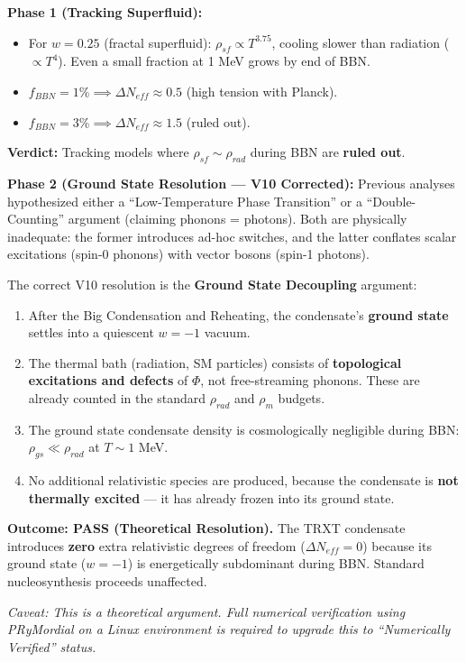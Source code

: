 \documentclass[a4paper,12pt]{article}
\begin{document}
\textbf{Phase 1 (Tracking Superfluid):}
\begin{itemize}
    \item For $w = 0.25$ (fractal superfluid): $\rho_{sf} \propto T^{3.75}$, cooling slower than radiation ($\propto T^4$). Even a small fraction at 1 MeV grows by end of BBN.
    \item $f_{BBN} = 1\% \implies \Delta N_{eff} \approx 0.5$ (high tension with Planck).
    \item $f_{BBN} = 3\% \implies \Delta N_{eff} \approx 1.5$ (ruled out).
\end{itemize}
\textbf{Verdict:} Tracking models where $\rho_{sf} \sim \rho_{rad}$ during BBN are \textbf{ruled out}.

\textbf{Phase 2 (Ground State Resolution --- V10 Corrected):}
Previous analyses hypothesized either a ``Low-Temperature Phase Transition'' or a ``Double-Counting'' argument (claiming phonons = photons). Both are physically inadequate: the former introduces ad-hoc switches, and the latter conflates scalar excitations (spin-0 phonons) with vector bosons (spin-1 photons).

The correct V10 resolution is the \textbf{Ground State Decoupling} argument:
\begin{enumerate}
    \item After the Big Condensation and Reheating, the condensate's \textbf{ground state} settles into a quiescent $w = -1$ vacuum.
    \item The thermal bath (radiation, SM particles) consists of \textbf{topological excitations and defects} of $\Phi$, not free-streaming phonons. These are already counted in the standard $\rho_{rad}$ and $\rho_m$ budgets.
    \item The ground state condensate density is cosmologically negligible during BBN: $\rho_{gs} \ll \rho_{rad}$ at $T \sim 1$ MeV.
    \item No additional relativistic species are produced, because the condensate is \textbf{not thermally excited} --- it has already frozen into its ground state.
\end{enumerate}

\textbf{Outcome: PASS (Theoretical Resolution).} The TRXT condensate introduces \textbf{zero} extra relativistic degrees of freedom ($\Delta N_{eff} = 0$) because its ground state ($w = -1$) is energetically subdominant during BBN. Standard nucleosynthesis proceeds unaffected.

\textit{Caveat: This is a theoretical argument. Full numerical verification using PRyMordial on a Linux environment is required to upgrade this to ``Numerically Verified'' status.}
\end{document}
